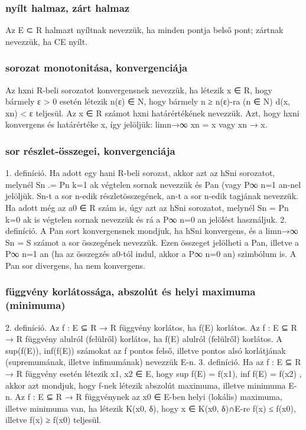 \documentclass[12pt]{article}
\begin{document}
\subsubsection{nyílt halmaz, zárt halmaz}

Az E ⊂ R halmazt nyíltnak nevezzük, ha minden pontja
belső pont; zártnak nevezzük, ha CE nyílt.

\subsubsection{sorozat monotonitása, konvergenciája}

Az hxni R-beli sorozatot konvergensnek
nevezzük, ha létezik x ∈ R, hogy bármely ε > 0 esetén létezik n(ε) ∈ N,
hogy bármely n ≥ n(ε)-ra (n ∈ N) d(x, xn) < ε teljesül. Az x ∈ R számot
hxni határértékének nevezzük. Azt, hogy hxni konvergens és határértéke x,
így jelöljük: limn→∞
xn = x vagy xn → x.

\subsubsection{sor részlet-összegei, konvergenciája}

1. definíció. Ha adott egy hani R-beli sorozat, akkor azt az hSni sorozatot,
melynél Sn
.=
Pn
k=1
ak végtelen sornak nevezzük és Pan (vagy P∞
n=1
an-nel
jelöljük. Sn-t a sor n-edik részletösszegének, an-t a sor n-edik tagjának
nevezzük. Ha adott még az a0 ∈ R szám is, úgy azt az hSni sorozatot,
melynél Sn =
Pn
k=0
ak is végtelen sornak nevezzük és rá a
P∞
n=0
an jelölést
használjuk.
2. definíció. A
Pan sort konvergensnek mondjuk, ha hSni konvergens,
és a limn→∞
Sn = S számot a sor összegének nevezzük.
Ezen összeget jelölheti a
Pan, illetve a
P∞
n=1
an (ha az összegzés a0-tól indul,
akkor a
P∞
n=0
an) szimbólum is.
A
Pan sor divergens, ha nem konvergens.

\subsubsection{függvény korlátossága, abszolút és helyi maximuma (minimuma)}

2. definíció. Az f : E ⊆ R → R függvény korlátos, ha f(E) korlátos.
Az f : E ⊆ R → R függvény alulról (felülről) korlátos, ha f(E) alulról
(felülről) korlátos.
A sup(f(E)), inf(f(E)) számokat az f pontos felső, illetve pontos alsó korlátjának
(supremumának, illetve infimumának) nevezzük E-n.
3. definíció. Ha az f : E ⊆ R → R függvény esetén létezik x1, x2 ∈ E,
hogy
sup f(E) = f(x1), inf f(E) = f(x2) ,
akkor azt mondjuk, hogy f-nek létezik abszolút maximuma, illetve minimuma
E-n.
Az f : E ⊆ R → R függvénynek az x0 ∈ E-ben helyi (lokális) maximuma,
illetve minimuma van, ha létezik K(x0, δ), hogy x ∈ K(x0, δ)∩E-re
f(x) ≤ f(x0), illetve f(x) ≥ f(x0) teljesül.
\end{document}
